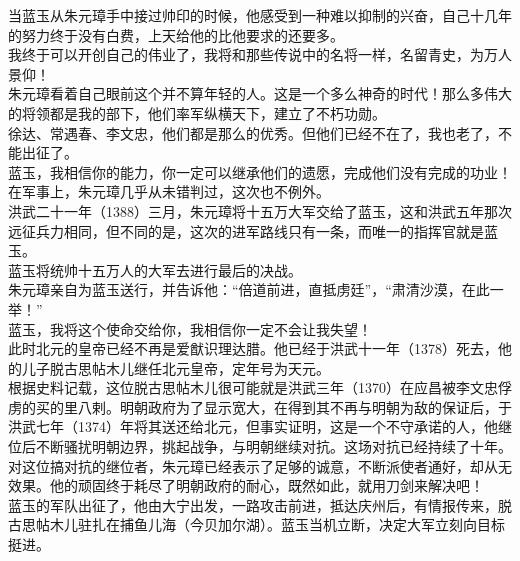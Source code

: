 \begin{multicols}{\theparacolNo}
当蓝玉从朱元璋手中接过帅印的时候，他感受到一种难以抑制的兴奋，自己十几年的努力终于没有白费，上天给他的比他要求的还要多。\\

我终于可以开创自己的伟业了，我将和那些传说中的名将一样，名留青史，为万人景仰！\\

朱元璋看着自己眼前这个并不算年轻的人。这是一个多么神奇的时代！那么多伟大的将领都是我的部下，他们率军纵横天下，建立了不朽功勋。\\

徐达、常遇春、李文忠，他们都是那么的优秀。但他们已经不在了，我也老了，不能出征了。\\

蓝玉，我相信你的能力，你一定可以继承他们的遗愿，完成他们没有完成的功业！\\

在军事上，朱元璋几乎从未错判过，这次也不例外。\\

洪武二十一年（1388）三月，朱元璋将十五万大军交给了蓝玉，这和洪武五年那次远征兵力相同，但不同的是，这次的进军路线只有一条，而唯一的指挥官就是蓝玉。\\

蓝玉将统帅十五万人的大军去进行最后的决战。\\

朱元璋亲自为蓝玉送行，并告诉他：“倍道前进，直抵虏廷”，“肃清沙漠，在此一举！”\\

蓝玉，我将这个使命交给你，我相信你一定不会让我失望！\\

此时北元的皇帝已经不再是爱猷识理达腊。他已经于洪武十一年（1378）死去，他的儿子脱古思帖木儿继任北元皇帝，定年号为天元。\\

根据史料记载，这位脱古思帖木儿很可能就是洪武三年（1370）在应昌被李文忠俘虏的买的里八剌。明朝政府为了显示宽大，在得到其不再与明朝为敌的保证后，于洪武七年（1374）年将其送还给北元，但事实证明，这是一个不守承诺的人，他继位后不断骚扰明朝边界，挑起战争，与明朝继续对抗。这场对抗已经持续了十年。\\

对这位搞对抗的继位者，朱元璋已经表示了足够的诚意，不断派使者通好，却从无效果。他的顽固终于耗尽了明朝政府的耐心，既然如此，就用刀剑来解决吧！\\

蓝玉的军队出征了，他由大宁出发，一路攻击前进，抵达庆州后，有情报传来，脱古思帖木儿驻扎在捕鱼儿海（今贝加尔湖）。蓝玉当机立断，决定大军立刻向目标挺进。\\


\end{multicols}
